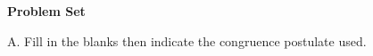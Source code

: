 \def\figdir{/storage/emulated/0/Documents/documents/latex/1920/Grade-8/3rd/triangle-congruence-postulates/f}


\textbf{Problem Set}

\vspce
A. Fill in the blanks then indicate the congruence postulate used. 

{\begin{enumerate}[label = \arabic*. ]
\begin{multicols}{3}
\item 
\item 
\item 
\item 
\item 
\item 

\end{multicols} 
\end{enumerate}}

